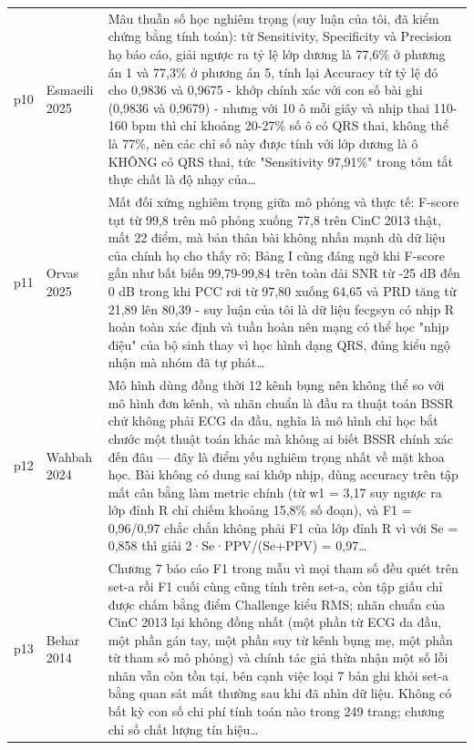 \begin{longtable}{@{}L{1.05cm} L{3.2cm} L{10.1cm}@{}}
p10 & {\scriptsize Esmaeili 2025} & {\scriptsize Mâu thuẫn số học nghiêm trọng (suy luận của tôi, đã kiểm chứng bằng tính toán): từ Sensitivity, Specificity và Precision họ báo cáo, giải ngược ra tỷ lệ lớp dương là 77,6\% ở phương án 1 và 77,3\% ở phương án 5, tính lại Accuracy từ tỷ lệ đó cho 0,9836 và 0,9675 - khớp chính xác với con số bài ghi (0,9836 và 0,9679) - nhưng với 10 ô mỗi giây và nhịp thai 110-160 bpm thì chỉ khoảng 20-27\% số ô có QRS thai, không thể là 77\%, nên các chỉ số này được tính với lớp dương là ô KHÔNG có QRS thai, tức "Sensitivity 97,91\%" trong tóm tắt thực chất là độ nhạy của…} \\[2pt]
p11 & {\scriptsize Orvas 2025} & {\scriptsize Mất đối xứng nghiêm trọng giữa mô phỏng và thực tế: F-score tụt từ 99,8 trên mô phỏng xuống 77,8 trên CinC 2013 thật, mất 22 điểm, mà bản thân bài không nhấn mạnh dù dữ liệu của chính họ cho thấy rõ; Bảng I cũng đáng ngờ khi F-score gần như bất biến 99,79-99,84 trên toàn dải SNR từ -25 dB đến 0 dB trong khi PCC rơi từ 97,80 xuống 64,65 và PRD tăng từ 21,89 lên 80,39 - suy luận của tôi là dữ liệu fecgsyn có nhịp R hoàn toàn xác định và tuần hoàn nên mạng có thể học "nhịp điệu" của bộ sinh thay vì học hình dạng QRS, đúng kiểu ngộ nhận mà nhóm đã tự phát…} \\[2pt]
p12 & {\scriptsize Wahbah 2024} & {\scriptsize Mô hình dùng đồng thời 12 kênh bụng nên không thể so với mô hình đơn kênh, và nhãn chuẩn là đầu ra thuật toán BSSR chứ không phải ECG da đầu, nghĩa là mô hình chỉ học bắt chước một thuật toán khác mà không ai biết BSSR chính xác đến đâu — đây là điểm yếu nghiêm trọng nhất về mặt khoa học. Bài không có dung sai khớp nhịp, dùng accuracy trên tập mất cân bằng làm metric chính (từ w1 = 3,17 suy ngược ra lớp đỉnh R chỉ chiếm khoảng 15,8\% số đoạn), và F1 = 0,96/0,97 chắc chắn không phải F1 của lớp đỉnh R vì với Se = 0,858 thì giải 2·Se·PPV/(Se+PPV) = 0,97…} \\[2pt]
p13 & {\scriptsize Behar 2014} & {\scriptsize Chương 7 báo cáo F1 trong mẫu vì mọi tham số đều quét trên set-a rồi F1 cuối cùng cũng tính trên set-a, còn tập giấu chỉ được chấm bằng điểm Challenge kiểu RMS; nhãn chuẩn của CinC 2013 lại không đồng nhất (một phần từ ECG da đầu, một phần gán tay, một phần suy từ kênh bụng mẹ, một phần từ tham số mô phỏng) và chính tác giả thừa nhận một số lỗi nhãn vẫn còn tồn tại, bên cạnh việc loại 7 bản ghi khỏi set-a bằng quan sát mắt thường sau khi đã nhìn dữ liệu. Không có bất kỳ con số chi phí tính toán nào trong 249 trang; chương chỉ số chất lượng tín hiệu…} \\[2pt]

\end{longtable}
